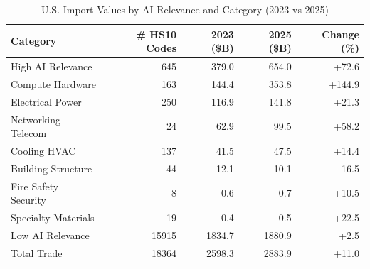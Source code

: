 \begin{table}[htbp]
\centering
\caption{U.S. Import Values by AI Relevance and Category (2023 vs 2025)}
\label{tab:trade_hierarchical}
\setlength{\tabcolsep}{4.5mm}
\renewcommand{\arraystretch}{1.60}
\begin{tabular}{lrrrr}
\toprule
Category & \# HS10 Codes & 2023 (\$B) & 2025 (\$B) & Change (\%) \\
\midrule
High AI Relevance & 645 & 379.0 & 654.0 & +72.6 \\
\quad\quad Compute Hardware & 163 & 144.4 & 353.8 & +144.9 \\
\quad\quad Electrical Power & 250 & 116.9 & 141.8 & +21.3 \\
\quad\quad Networking Telecom & 24 & 62.9 & 99.5 & +58.2 \\
\quad\quad Cooling HVAC & 137 & 41.5 & 47.5 & +14.4 \\
\quad\quad Building Structure & 44 & 12.1 & 10.1 & -16.5 \\
\quad\quad Fire Safety Security & 8 & 0.6 & 0.7 & +10.5 \\
\quad\quad Specialty Materials & 19 & 0.4 & 0.5 & +22.5 \\
Low AI Relevance & 15915 & 1834.7 & 1880.9 & +2.5 \\
\midrule
Total Trade & 18364 & 2598.3 & 2883.9 & +11.0 \\
\bottomrule
\end{tabular}
\end{table}

